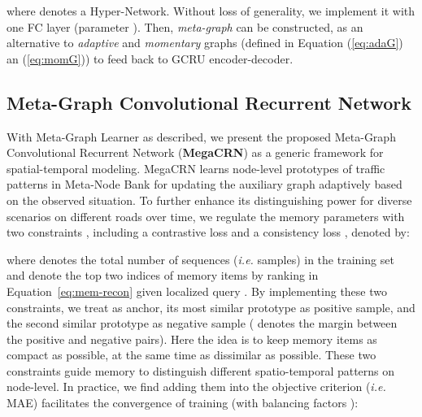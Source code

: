 \documentclass[letterpaper]{article} \usepackage{aaai23}  \usepackage{times}  \usepackage{helvet}  \usepackage{courier}  \usepackage[hyphens]{url}  \usepackage{graphicx} \urlstyle{rm} \def\UrlFont{\rm}  \usepackage{natbib}  \usepackage{caption} \usepackage{multirow}
\begin{document}
where  denotes a Hyper-Network. Without loss of generality, we implement it with one FC layer (parameter ). Then, \textit{meta-graph}  can be constructed, as an alternative to \textit{adaptive} and \textit{momentary} graphs (defined in Equation (\ref{eq:adaG}) an (\ref{eq:momG})) to feed back to GCRU encoder-decoder. 


\subsection{Meta-Graph Convolutional Recurrent Network}
With Meta-Graph Learner as described, we present the proposed Meta-Graph Convolutional Recurrent Network (\textbf{MegaCRN}) as a generic framework for spatial-temporal modeling. MegaCRN learns node-level prototypes of traffic patterns in Meta-Node Bank for updating  the auxiliary graph adaptively based on the observed situation. To further enhance its distinguishing power for diverse scenarios on different roads over time, we regulate the memory parameters with two constraints \cite{gong2019memorizing, park2020learning}, including a contrastive loss  and a consistency loss , denoted by:

where  denotes the total number of sequences (\textit{i.e.} samples) in the training set and  denote the top two indices of memory items by ranking  in Equation~\ref{eq:mem-recon} given localized query . By implementing these two constraints, we treat  as anchor, its most similar prototype  as positive sample, and the second similar prototype  as negative sample ( denotes the margin between the positive and negative pairs). Here the idea is to keep memory items as compact as possible, at the same time as dissimilar as possible. These two constraints guide memory  to distinguish different spatio-temporal patterns on node-level. In practice, we find adding them into the objective criterion (\textit{i.e.} MAE) facilitates the convergence of training (with balancing factors ):
\end{document}
